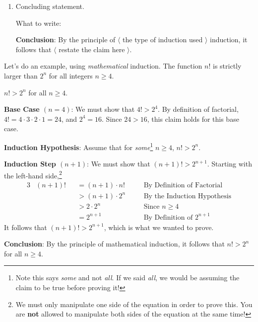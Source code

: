 \begin{enumerate}
	\item Concluding statement.
	
	What to write:
	\begin{mdframed}[align=center]
		\textbf{Conclusion}: By the principle of $\langle$ the type of induction used $\rangle$ induction, it follows that $\langle$ restate the claim here $\rangle$.
	\end{mdframed}
	
\end{enumerate}

Let's do an example, using \emph{mathematical} induction. The function $n!$ is strictly larger than $2^n$ for all integers $n \ge 4$.

\begin{claim*}
	$n! > 2^n$ for all $n \ge 4$.
\end{claim*}

\begin{proofmathinduction}[$n \ge 4$]

	\textbf{Base Case $(n = 4)$}: We must show that $4! > 2^4$. By definition of factorial, $4! = 4 \cdot 3 \cdot 2 \cdot 1 = 24$, and $2^4 = 16$. Since $24 > 16$, this claim holds for this base case.
	
	\textbf{Induction Hypothesis}: Assume that for \emph{some}\footnote{Note this says \emph{some} and not \emph{all}. If we said \emph{all}, we would be assuming the claim to be true before proving it!} $n \ge 4$, $n! > 2^n$.
	
	\textbf{Induction Step $(n + 1)$}: We must show that $(n+1)! > 2^{n+1}$. Starting with the left-hand side,\footnote{We must only manipulate one side of the equation in order to prove this. You are \textbf{not} allowed to manipulate both sides of the equation at the same time!}
	\begin{alignat*}{3}
		&(n+1)! &&= (n+1) \cdot n! \quad && \text{By Definition of Factorial} \\
		& 		&&> (n+1) \cdot 2^n \quad&& \text{By the Induction Hypothesis} \\
		& 		&&> 2 \cdot 2^n \quad&& \text{Since $n \ge 4$} \\
		&		&&= 2^{n+1} \quad&& \text{By Definition of $2^{n+1}$}
 	\end{alignat*}
 	It follows that $(n+1)! > 2^{n+1}$, which is what we wanted to prove.
 	
 	\textbf{Conclusion}: By the principle of mathematical induction, it follows that $n! > 2^n$ for all $n \ge 4$.
\end{proofmathinduction}

